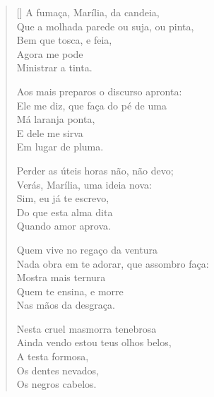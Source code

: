 \documentclass[12pt]{book}
\begin{document}
\begin{enumerate}
\begin{verse}[\versewidth]
						A fumaça, Marília, da candeia, \\
						Que a molhada parede ou suja, ou pinta, \\
						\hspace{2em} Bem que tosca, e feia, \\
						\hspace{2em} Agora me pode \\
						\hspace{2em} Ministrar a tinta.
						
						Aos mais preparos o discurso apronta: \\
						Ele me diz, que faça do pé de uma \\
						\hspace{2em} Má laranja ponta, \\
						\hspace{2em} E dele me sirva \\
						\hspace{2em} Em lugar de pluma.
						
						Perder as úteis horas não, não devo; \\
						Verás, Marília, uma ideia nova: \\
						\hspace{2em} Sim, eu já te escrevo, \\
						\hspace{2em} Do que esta alma dita \\
						\hspace{2em} Quando amor aprova.
						
						Quem vive no regaço da ventura \\
						Nada obra em te adorar, que assombro faça: \\
						\hspace{2em} Mostra mais ternura \\
						\hspace{2em} Quem te ensina, e morre \\
						\hspace{2em} Nas mãos da desgraça.
						
						Nesta cruel masmorra tenebrosa \\
						Ainda vendo estou teus olhos belos, \\
						\hspace{2em} A testa formosa, \\
						\hspace{2em} Os dentes nevados, \\
						\hspace{2em} Os negros cabelos.
						

\end{verse}
\end{enumerate}
\end{document}
